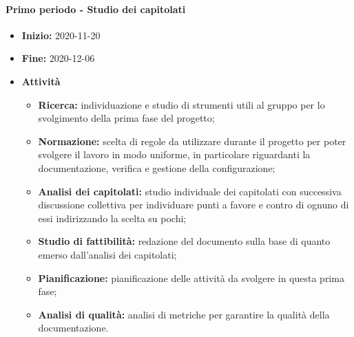 \paragraph[Primo periodo]{Primo periodo - \textnormal{Studio dei capitolati}}
\begin{itemize}
    \item [] \textbf{Inizio:} 2020-11-20
    \item [] \textbf{Fine:} 2020-12-06
    \item [] \textbf{Attività}
          \begin{itemize}
              \item \textbf{Ricerca:} individuazione e studio di strumenti utili al gruppo per lo svolgimento della prima fase del progetto;
              \item \textbf{Normazione:} scelta di regole da utilizzare durante il progetto per poter svolgere il lavoro in modo uniforme, in particolare riguardanti la documentazione, verifica e gestione della configurazione;
              \item \textbf{Analisi dei capitolati:} studio individuale dei capitolati con successiva discussione collettiva per individuare punti a favore e contro di ognuno di essi indirizzando la scelta su pochi;
              \item \textbf{Studio di fattibilità:} redazione del documento sulla base di quanto emerso dall'analisi dei capitolati;
              \item \textbf{Pianificazione:} pianificazione delle attività da svolgere in questa prima fase;
              \item \textbf{Analisi di qualità:} analisi di metriche per garantire la qualità della documentazione.
          \end{itemize}
\end{itemize}

